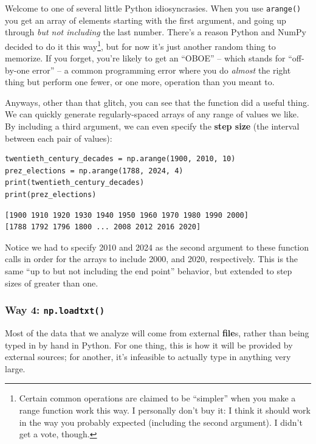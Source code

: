 Welcome to one of several little Python idiosyncrasies. When you use
\texttt{arange()} you get an array of elements starting with the first
argument, and going up through \textit{but not including} the last number.
There's a reason Python and NumPy decided to do it this way\footnote{Certain
common operations are claimed to be ``simpler'' when you make a range function
work this way. I personally don't buy it: I think it should work in the way you
probably expected (including the second argument). I didn't get a vote,
though.}, but for now it's just another random thing to memorize. If you
forget, you're likely to get an ``OBOE'' -- which stands for ``off-by-one
error'' -- a common programming error where you do \textit{almost} the right
thing but perform one fewer, or one more, operation than you meant to.

Anyways, other than that glitch, you can see that the function did a useful
thing. We can quickly generate regularly-spaced arrays of any range of values
we like. By including a third argument, we can even specify the \textbf{step
size} (the interval between each pair of values):

\begin{Verbatim}[fontsize=\small,samepage=true,frame=single,framesep=3mm]
twentieth_century_decades = np.arange(1900, 2010, 10)
prez_elections = np.arange(1788, 2024, 4)
print(twentieth_century_decades)
print(prez_elections)
\end{Verbatim}

\begin{Verbatim}[fontsize=\small,samepage=true,frame=leftline,framesep=5mm,framerule=1mm]
[1900 1910 1920 1930 1940 1950 1960 1970 1980 1990 2000]
[1788 1792 1796 1800 ... 2008 2012 2016 2020]
\end{Verbatim}

Notice we had to specify 2010 and 2024 as the second argument to these function
calls in order for the arrays to include 2000, and 2020, respectively. This is
the same ``up to but not including the end point'' behavior, but extended to
step sizes of greater than one.

\subsubsection{Way 4: \texttt{np.loadtxt()}}
\label{np.loadtxt}


Most of the data that we analyze will come from external \textbf{file}s, rather
than being typed in by hand in Python. For one thing, this is how it will be
provided by external sources; for another, it's infeasible to actually type in
anything very large.

